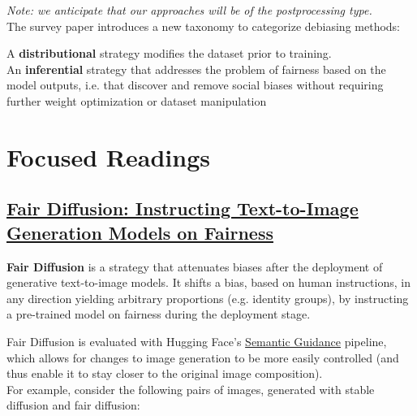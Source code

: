 \documentclass[12pt]{amsart}
\begin{document}
\textit{Note: we anticipate that our approaches will be of the postprocessing type.} \\

The survey paper introduces a new taxonomy to categorize debiasing methods: 

\begin{definition}
A \textbf{distributional} strategy modifies the dataset prior to training. \\

An \textbf{inferential} strategy that addresses the problem of fairness based on the model outputs, i.e. that discover and remove social biases without requiring further weight optimization or dataset manipulation
\end{definition}




\newpage

\section{Focused Readings}
\subsection{\href{https://arxiv.org/abs/2302.10893}{Fair Diffusion: Instructing Text-to-Image Generation Models on Fairness}}

\begin{approach*}
\textbf{Fair Diffusion} is a strategy that attenuates biases after the deployment of generative text-to-image models. It shifts a bias, based on human instructions, in any direction yielding arbitrary proportions (e.g. identity groups), by instructing a pre-trained model on fairness during the deployment stage.
\end{approach*}

Fair Diffusion is evaluated with Hugging Face's \href{https://huggingface.co/docs/diffusers/api/pipelines/semantic_stable_diffusion}{Semantic Guidance} pipeline, which allows for changes to image generation to be more easily controlled (and thus enable it to stay closer to the original image composition). \\

For example, consider the following pairs of images, generated with stable diffusion and fair diffusion: 
\end{document}
